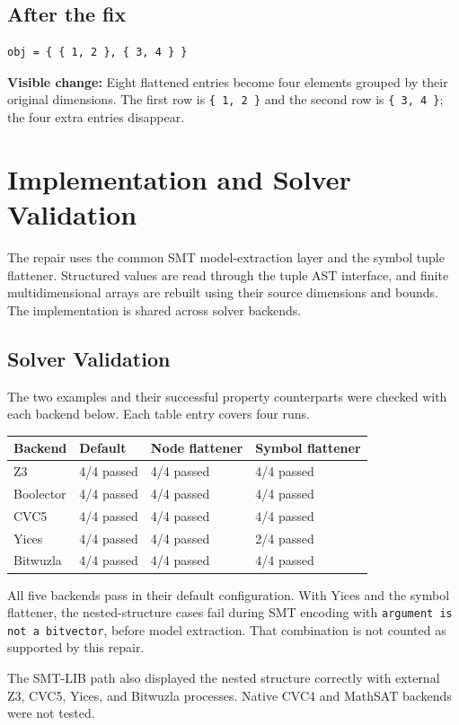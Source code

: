 \documentclass[11pt]{article}
\begin{document}
\subsection*{After the fix}

\begin{lstlisting}
obj = { { 1, 2 }, { 3, 4 } }
\end{lstlisting}

\noindent\textbf{Visible change:} Eight flattened entries become four elements
grouped by their original dimensions. The first row is \texttt{\{ 1, 2 \}} and
the second row is \texttt{\{ 3, 4 \}}; the four extra entries disappear.

\section{Implementation and Solver Validation}

The repair uses the common SMT model-extraction layer and the symbol tuple
flattener. Structured values are read through the tuple AST interface, and
finite multidimensional arrays are rebuilt using their source dimensions and
bounds. The implementation is shared across solver backends.

\subsection{Solver Validation}

The two examples and their successful property counterparts were checked with
each backend below. Each table entry covers four runs.

\begin{tabularx}{\textwidth}{|l|X|X|X|}
\hline
\textbf{Backend} & \textbf{Default} & \textbf{Node flattener} & \textbf{Symbol flattener} \\
\hline
Z3 & 4/4 passed & 4/4 passed & 4/4 passed \\
\hline
Boolector & 4/4 passed & 4/4 passed & 4/4 passed \\
\hline
CVC5 & 4/4 passed & 4/4 passed & 4/4 passed \\
\hline
Yices & 4/4 passed & 4/4 passed & 2/4 passed \\
\hline
Bitwuzla & 4/4 passed & 4/4 passed & 4/4 passed \\
\hline
\end{tabularx}

All five backends pass in their default configuration. With Yices and the
symbol flattener, the nested-structure cases fail during SMT encoding with
\texttt{argument is not a bitvector}, before model extraction. That combination
is not counted as supported by this repair.

The SMT-LIB path also displayed the nested structure correctly with external
Z3, CVC5, Yices, and Bitwuzla processes. Native CVC4 and MathSAT backends were
not tested.
\end{document}
